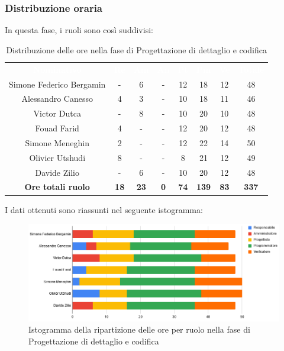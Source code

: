 \subsubsection{Distribuzione oraria}
In questa fase, i ruoli sono così suddivisi:
\begin{table}[H]
\centering\renewcommand{\arraystretch}{1.5}
\caption{Distribuzione delle ore nella fase di Progettazione di dettaglio e codifica}
\vspace{0.2cm}
\begin{tabular}{ c | c | c | c | c | c | c | c }
\rowcolor{redafk}
\textcolor{white}{\textbf{Nominativo}} & \textcolor{white}{\textbf{Re}} &
\textcolor{white}{\textbf{Am}} & \textcolor{white}{\textbf{An}} &
\textcolor{white}{\textbf{Pt}} & \textcolor{white}{\textbf{Pm}} &
\textcolor{white}{\textbf{Ve}} & \textcolor{white}{\textbf{Totale}} \\
Simone Federico Bergamin & - & 6 & - & 12 & 18 & 12 & 48 \\
Alessandro Canesso & 4 & 3 & - & 10 & 18 & 11 & 46 \\
Victor Dutca & - & 8 & - & 10 & 20 & 10 & 48 \\
Fouad Farid & 4 & - & - & 12 & 20 & 12 & 48 \\
Simone Meneghin & 2 & - & - & 12 & 22 & 14 & 50 \\
Olivier Utshudi & 8 & - & - & 8 & 21 & 12 & 49 \\
Davide Zilio & - & 6 & - & 10 & 20 & 12 & 48 \\
\rowcolor{lastrowcolor}
\textbf{Ore totali ruolo} & \textbf{18} & \textbf{23} & \textbf{0} & \textbf{74} & \textbf{139} & \textbf{83} & \textbf{337} \\
\end{tabular}
\end{table}
 
I dati ottenuti sono riassunti nel seguente istogramma:
\begin{figure}[H]
\centering
\includegraphics[scale=0.60]{img/grafici/tabella_fase_prog_cod.png}
\caption{Istogramma della ripartizione delle ore per ruolo nella fase di Progettazione di dettaglio e codifica}
\end{figure}
 
